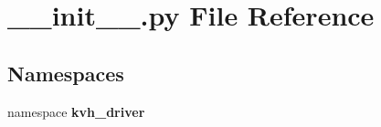 \section{\-\_\-\-\_\-init\-\_\-\-\_\-.\-py \-File \-Reference}
\label{devel_2lib_2python2_87_2dist-packages_2kvh__driver_2____init_____8py}
\subsection*{\-Namespaces}
\begin{DoxyCompactItemize}
\item 
namespace {\bf kvh\-\_\-driver}
\end{DoxyCompactItemize}

